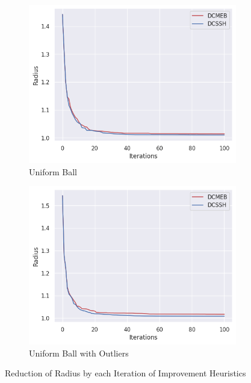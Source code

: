 \documentclass[11pt,twoside]{report}
\theoremstyle{definition}
\numberwithin{theorem}{section}
\numberwithin{definition}{section}
\numberwithin{lemma}{section}
\numberwithin{proposition}{section}
\numberwithin{equation}{section}
\numberwithin{figure}{section}
\begin{document}
\begin{figure}
\begin{subfigure}[b]{0.475\textwidth}
        \centering
        \includegraphics[width=\textwidth]{improvement_example/improvement_example_uniform_ball.png}
        \caption{Uniform Ball}
    \end{subfigure}
    \hfill
    \begin{subfigure}[b]{0.475\textwidth}
        \centering
        \includegraphics[width=\textwidth]{improvement_example/improvement_example_uniform_ball_with_outliers.png}
        \caption{Uniform Ball with Outliers}
    \end{subfigure}
    \caption{Reduction of Radius by each Iteration of Improvement Heuristics}
    \label{fig:riterations}
\end{figure}
\end{document}
